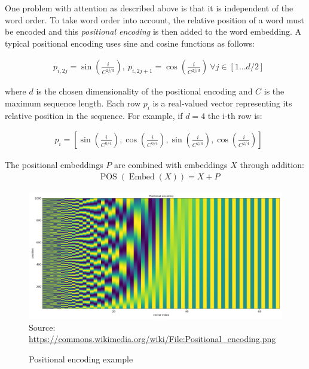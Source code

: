 One problem with attention as described above is that it is independent of the word order. To take word order into account, the relative position of a word must be encoded and this \emph{positional encoding} is then added to the word embedding. A typical positional encoding uses sine and cosine functions as follows:

\begin{align}
&p_{i, 2j} = \sin \left( \frac{i}{C^{2j/d}} \right), \ p_{i, 2j+1} = \cos \left( \frac{i}{C^{2j/d}} \right) \ \forall j \in [1 \ldots d/2]  \label{eq:pos_encoding}
\end{align}

where $d$ is the chosen dimensionality of the positional encoding and  $C$ is the maximum sequence length. Each row $p_i$ is a real-valued vector representing its relative position in the sequence. For example, if $d=4$ the i-th row is:

\begin{align*}
&p_i = [ \sin(\frac{i}{C^{0/4}}), \cos(\frac{i}{C^{0/4}}), \sin(\frac{i}{C^{2/4}}), \cos(\frac{i}{C^{2/4}}) ]
\end{align*}

The positional embeddings $P$ are combined with embeddings $X$ through addition:
\begin{align}
&\operatorname{POS}(\operatorname{Embed}(X)) = X + P \label{eq:pos_encoding2}
\end{align}

\begin{figure}
\begin{center}
\includegraphics[width=.8\textwidth]{Positional_encoding.png} \\

\scriptsize Source: \url{https://commons.wikimedia.org/wiki/File:Positional_encoding.png} \normalsize
\end{center}
\caption{Positional encoding example}
\label{fig:positional_encoding}
\end{figure}

